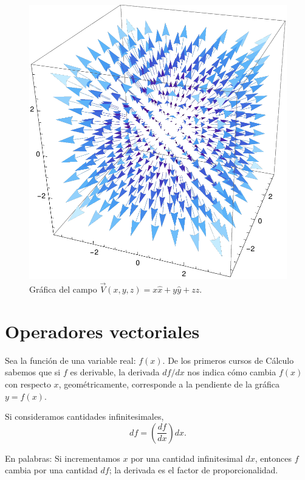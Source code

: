 \begin{ejemplo}
\begin{itemize}
        \begin{figure}[H]
            \centering
            \includegraphics[scale = 0.44]{Figuras/CampoVectorial2.pdf}
            \caption{Gráfica del campo  $\vec{V}(x,y,z) = x \hat{x} + y \hat{y} + z \hat{z}$.}
            \label{fig:Campo_Vectorial2}
        \end{figure}
    \end{itemize}
\end{ejemplo}

\section{Operadores vectoriales} \label{Operadores}

Sea la función de una variable real: $f(x)$. De los primeros cursos de Cálculo sabemos que si $f$ es derivable, la derivada $df/dx$ nos indica cómo cambia $f(x)$ con respecto $x$, geométricamente, corresponde a la pendiente de la gráfica $y = f(x)$. 

Si consideramos cantidades infinitesimales,
$$df = \left(\frac{df}{dx} \right) dx.$$

En palabras: Si incrementamos $x$ por una cantidad infinitesimal $dx$, entonces $f$ cambia por una cantidad $df$; la derivada es el factor de proporcionalidad.

